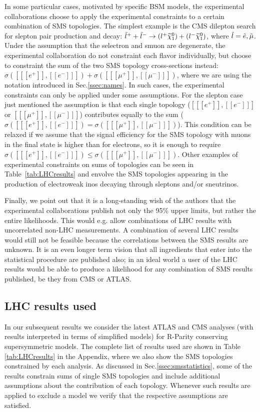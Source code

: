 In some particular cases, motivated by specific BSM models, the experimental collaborations
choose to apply the experimental constraints to a certain combination of SMS topologies.
The simplest example is the CMS dilepton search\cite{SUS-12-022} 
for slepton pair production and decay: $\tilde{l}^+ + \tilde{l}^- \rightarrow (l^+ \widetilde{\chi}^0_1) + (l^- \widetilde{\chi}^0_1)$,
where $\tilde{l} = \tilde{e}, \tilde{\mu}$.
Under the assumption that the selectron and smuon are degenerate, the experimental collaboration
do not constraint each flavor individually, but choose to constraint the sum of the two SMS topology
 cross-sections instead: $\sigma([[[e^+]],[[e^-]]]) + \sigma([[[\mu^+]],[[\mu^-]]])$,
where we are using the notation introduced in Sec.\ref{ssec:names}. In such cases, the experimental
constraints can only be applied under some assumptions. For the slepton case just
mentioned the assumption is that each single topology ($[[[e^+]],[[e^-]]]$ or $[[[\mu^+]],[[\mu^-]]]$)
contributes equally to the sum ($\sigma([[[e^+]],[[e^-]]]) = \sigma([[[\mu^+]],[[\mu^-]]])$). 
This condition can be relaxed if we assume that the signal efficiency for the SMS topology
with muons in the final state is higher than for electrons, so it is enough to require 
$\sigma([[[e^+]],[[e^-]]]) \leq \sigma([[[\mu^+]],[[\mu^-]]])$. 
Other examples of experimental constraints on sums of topologies can be seen in Table~\ref{tab:LHCresults}
and envolve the SMS topologies appearing in the production of electroweak inos 
decaying through sleptons and/or sneutrinos\cite{SUS-12-022,ATLAS-CONF-2013-035,ATLAS-CONF-2013-028,ATLAS-CONF-2013-036}.



Finally, we point out that it is a long-standing wish of the authors that the experimental
collaborations publish not only the 95\% upper limits, but rather the entire
likelihoods.  This would e.g. allow combinations of LHC results with
uncorrelated non-LHC measurements.  
A combination of several LHC results would still not be feasible because 
the correlations between the SMS results are unknown.
It is an even longer term vision that all ingredients that enter
into the statistical procedure are published also;
in an ideal world a user of the LHC results would be able to produce 
a likelihood for any combination of SMS results published, be they from CMS or
ATLAS.

\subsection{LHC results used}
\label{ssec:lhc}

In our subsequent results we consider the latest ATLAS and CMS analyses (with results
interpreted in terms of simplified models) for R-Parity conserving supersymmetric models. The complete list of
results used are shown in Table \ref{tab:LHCresults} in the Appendix, where we also show
the SMS topologies constrained by each analysis.
As discussed in Sec.\ref{ssec:smsstatistics}, some of the results constrain
sums of single SMS topologies and include additional assumptions about
the contribution of each topology. Whenever such results are applied to exclude a model 
we verify that the respective assumptions are satisfied.


